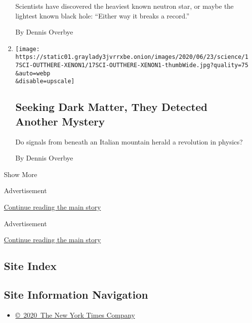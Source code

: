 \begin{enumerate}
  Scientists have discovered the heaviest known neutron star, or maybe
  the lightest known black hole: ``Either way it breaks a record.''

  By Dennis Overbye
\item
  \href{/2020/06/17/science/xenon-axions-neutrinos-tritium.html}{}

  \texttt{[image: https://static01.graylady3jvrrxbe.onion/images/2020/06/23/science/17SCI-OUTTHERE-XENON1/17SCI-OUTTHERE-XENON1-thumbWide.jpg?quality=75\\\&auto=webp\\\&disable=upscale]}

  \hypertarget{seeking-dark-matter-they-detected-another-mystery}{%
  \subsection{Seeking Dark Matter, They Detected Another
  Mystery}\label{seeking-dark-matter-they-detected-another-mystery}}

  Do signals from beneath an Italian mountain herald a revolution in
  physics?

  By Dennis Overbye
\end{enumerate}

Show More

Advertisement

\protect\hyperlink{after-mid1}{Continue reading the main story}

Advertisement

\protect\hyperlink{after-mktg}{Continue reading the main story}

\hypertarget{site-index}{%
\subsection{Site Index}\label{site-index}}

\hypertarget{site-information-navigation}{%
\subsection{Site Information
Navigation}\label{site-information-navigation}}

\begin{itemize}
\tightlist
\item
  \href{https://help.nytimes3xbfgragh.onion/hc/en-us/articles/115014792127-Copyright-notice}{©~2020~The
  New York Times Company}
\end{itemize}

